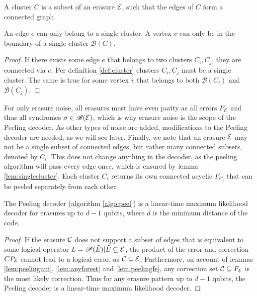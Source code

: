 \begin{definition}\label{def:cluster}
  A cluster $C$ is a subset of an erasure $\mathcal{E}$, such that the edges of $C$ form a connected graph. 
\end{definition}
\begin{lemma}\label{lem:singlecluster}
  An edge $e$ can only belong to a single cluster. A vertex $v$ can only be in the boundary of a single cluster $\mathscr{B}(C)$. 
\end{lemma}
\begin{proof}
  If there exists some edge $e$ that belongs to two clusters $C_i, C_j$, they are connected via $e$. Per definition \ref{def:cluster} clusters $C_i, C_j$ must be a single cluster. The same is true for some vertex $v$ that belongs to both $\mathscr{B}(C_i)$ and $\mathscr{B}(C_j)$. 
\end{proof}
For only erasure noise, all erasures must have even parity as all errors $P_{\mathcal{E}}$ and thus all syndromes $\sigma \in \mathscr{B}(\mathcal{E})$, which is why erasure noise is the scope of the Peeling decoder. As other types of noise are added, modifications to the Peeling decoder are needed, as we will see later. Finally, we note that an erasure $\mathcal{E}$ may not be a single subset of connected edges, but rather many connected subsets, denoted by $C_i$. This does not change anything in the decoder, as the peeling algorithm will pass every edge once, which is ensured by lemma \ref{lem:singlecluster}. Each cluster $C_i$ returns its own connected acyclic $F_{C_i}$ that can be peeled separately from each other. 
\begin{theorem}
  The Peeling decoder (algorithm \ref{algo:peel}) is a linear-time maximum likelihood decoder for erasures up to $d-1$ qubits, where $d$ is the minimum distance of the code. 
\end{theorem}
\begin{proof}
  If the erasure $\mathcal{C}$ does not support a subset of edges that is equivalent to some logical operator $L=\mathscr{P}(\tilde{E})|\tilde{E}\subseteq\mathcal{E}$, the product of the error and correction $CP_{\mathcal{E}}$ cannot lead to a logical error, as $\mathcal{C}\subseteq \mathcal{E}$. Furthermore, on account of lemmas \ref{lem:peelinguni}, \ref{lem:anyforest} and \ref{lem:peelingfe}, any correction set $\mathcal{C}\subseteq F_{\mathcal{E}}$ is the most likely correction. Thus for any erasure pattern up to $d-1$ qubits, the Peeling decoder is a linear-time maximum likelihood decoder. 
\end{proof}

